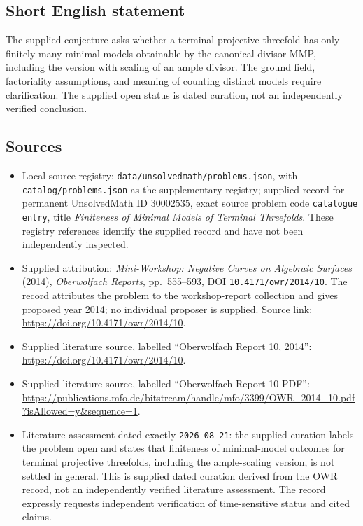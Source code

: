 \documentclass[11pt]{article}
\begin{document}
\subsection{Short English statement}
The supplied conjecture asks whether a terminal projective threefold has only finitely many minimal models obtainable by the canonical-divisor MMP, including the version with scaling of an ample divisor. The ground field, factoriality assumptions, and meaning of counting distinct models require clarification. The supplied open status is dated curation, not an independently verified conclusion.
\subsection{Sources}
\begin{itemize}
\item Local source registry: \texttt{data/unsolvedmath/problems.json}, with \texttt{catalog/problems.json} as the supplementary registry; supplied record for permanent UnsolvedMath ID \(30002535\), exact source problem code \texttt{catalogue entry}, title \emph{Finiteness of Minimal Models of Terminal Threefolds}. These registry references identify the supplied record and have not been independently inspected.
\item Supplied attribution: \emph{Mini-Workshop: Negative Curves on Algebraic Surfaces} (2014), \emph{Oberwolfach Reports}, pp.~555--593, DOI \texttt{10.4171/owr/2014/10}. The record attributes the problem to the workshop-report collection and gives proposed year 2014; no individual proposer is supplied. Source link: \url{https://doi.org/10.4171/owr/2014/10}.
\item Supplied literature source, labelled ``Oberwolfach Report 10, 2014'': \url{https://doi.org/10.4171/owr/2014/10}.
\item Supplied literature source, labelled ``Oberwolfach Report 10 PDF'': \url{https://publications.mfo.de/bitstream/handle/mfo/3399/OWR_2014_10.pdf?isAllowed=y\&sequence=1}.
\item Literature assessment dated exactly \texttt{2026-08-21}: the supplied curation labels the problem open and states that finiteness of minimal-model outcomes for terminal projective threefolds, including the ample-scaling version, is not settled in general. This is supplied dated curation derived from the OWR record, not an independently verified literature assessment. The record expressly requests independent verification of time-sensitive status and cited claims.
\end{itemize}
\end{document}
